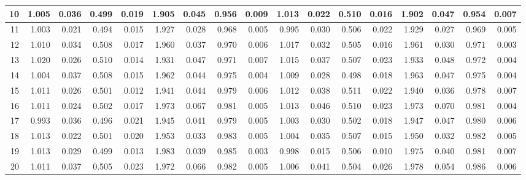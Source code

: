 \documentclass[
]{article}
\begin{document}
\begin{table}[H]
\begin{table}
{\begin{tabular}{r|r|r|r|r|r|r|r|r|r|r|r|r|r|r|r|r}
\hline
10 & 1.005 & 0.036 & 0.499 & 0.019 & 1.905 & 0.045 & 0.956 & 0.009 & 1.013 & 0.022 & 0.510 & 0.016 & 1.902 & 0.047 & 0.954 & 0.007\\
\hline
11 & 1.003 & 0.021 & 0.494 & 0.015 & 1.927 & 0.028 & 0.968 & 0.005 & 0.995 & 0.030 & 0.506 & 0.022 & 1.929 & 0.027 & 0.969 & 0.005\\
\hline
12 & 1.010 & 0.034 & 0.508 & 0.017 & 1.960 & 0.037 & 0.970 & 0.006 & 1.017 & 0.032 & 0.505 & 0.016 & 1.961 & 0.030 & 0.971 & 0.003\\
\hline
13 & 1.020 & 0.026 & 0.510 & 0.014 & 1.931 & 0.047 & 0.971 & 0.007 & 1.015 & 0.037 & 0.507 & 0.023 & 1.933 & 0.048 & 0.972 & 0.004\\
\hline
14 & 1.004 & 0.037 & 0.508 & 0.015 & 1.962 & 0.044 & 0.975 & 0.004 & 1.009 & 0.028 & 0.498 & 0.018 & 1.963 & 0.047 & 0.975 & 0.004\\
\hline
15 & 1.011 & 0.026 & 0.501 & 0.012 & 1.941 & 0.044 & 0.979 & 0.006 & 1.012 & 0.038 & 0.511 & 0.022 & 1.940 & 0.036 & 0.978 & 0.007\\
\hline
16 & 1.011 & 0.024 & 0.502 & 0.017 & 1.973 & 0.067 & 0.981 & 0.005 & 1.013 & 0.046 & 0.510 & 0.023 & 1.973 & 0.070 & 0.981 & 0.004\\
\hline
17 & 0.993 & 0.036 & 0.496 & 0.021 & 1.945 & 0.041 & 0.979 & 0.005 & 1.003 & 0.030 & 0.502 & 0.018 & 1.947 & 0.047 & 0.980 & 0.006\\
\hline
18 & 1.013 & 0.022 & 0.501 & 0.020 & 1.953 & 0.033 & 0.983 & 0.005 & 1.004 & 0.035 & 0.507 & 0.015 & 1.950 & 0.032 & 0.982 & 0.005\\
\hline
19 & 1.013 & 0.029 & 0.499 & 0.013 & 1.983 & 0.039 & 0.985 & 0.003 & 0.998 & 0.015 & 0.506 & 0.010 & 1.975 & 0.040 & 0.981 & 0.007\\
\hline
20 & 1.011 & 0.037 & 0.505 & 0.023 & 1.972 & 0.066 & 0.982 & 0.005 & 1.006 & 0.041 & 0.504 & 0.026 & 1.978 & 0.054 & 0.986 & 0.006\\
\hline
\end{tabular}}
\end{table}
\end{table}
\end{document}
